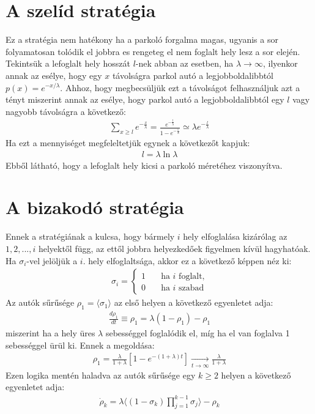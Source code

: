 \documentclass{article}
\begin{document}
	\section{A szelíd stratégia}
	Ez a stratégia nem hatékony ha a parkoló forgalma magas, ugyanis a sor folyamatosan tolódik el jobbra es rengeteg el nem foglalt hely lesz a sor elején. Tekintsük a lefoglalt hely hosszát $l$-nek abban az esetben, ha $\lambda \rightarrow \infty$, ilyenkor annak az esélye, hogy egy $x$ távolságra parkol autó a legjobboldalibbtól $p(x)=e^{-x/\lambda}$. Ahhoz, hogy megbecsüljük ezt a távolságot felhasználjuk azt a tényt miszerint annak az esélye, hogy parkol autó a legjobboldalibbtól egy $l$ vagy nagyobb távolságra a következő:
 	\begin{align}
		\sum_{x \geqslant l}e^{-\frac{x}{\lambda}} = \frac{e^{-\frac{l}{\lambda}}}{1-e^{-\frac{1}{\lambda}}} \simeq \lambda e^{-\frac{l}{\lambda}}
	\end{align}
	Ha ezt a mennyiséget megfeleltetjük egynek a következőt kapjuk: 
	\begin{align}
		l = \lambda \ln \lambda
	\end{align}
	Ebből látható, hogy a lefoglalt hely kicsi a parkoló méretéhez viszonyítva.
	\section{A bizakodó stratégia}
	Ennek a stratégiának a kulcsa, hogy bármely $i$ hely elfoglalása kizárólag az $1,2,...,i$ helyektől függ, az ettől jobbra helyezkedőek figyelmen kívül hagyhatóak.\\
	Ha $\sigma_i$-vel jelöljük a $i$. hely elfoglaltsága, akkor ez a következő képpen néz ki:
	\begin{align}
		\sigma_i=
		\begin{cases}
			1 &\quad \text{ha $i$ foglalt,} \\
			0 &\quad \text{ha $i$ szabad}
		\end{cases}
	\end{align}
	Az autók sűrűsége $\rho_1=\langle\sigma_1\rangle$ az első helyen a következő egyenletet adja:
	\begin{align}
		\frac{d\rho_1}{dt} \equiv \rho_1 = \lambda(1-\rho_1)-\rho_1
	\end{align}
	miszerint ha a hely üres $\lambda$ sebességgel foglalódik el, míg ha  el van foglalva 1 sebességgel ürül ki. Ennek a megoldása:
	\begin{align}
		\rho_1=\frac{\lambda}{1+\lambda}[1-e^{-(1+\lambda)t}]\xrightarrow[t \to \infty]{}\frac{\lambda}{1+\lambda}
	\end{align}
	Ezen logika mentén haladva az autók sűrűsége egy $k \geqslant 2$ helyen a következő egyenletet adja:
	\begin{align}
		\label{eq4}
		\dot{\rho}_k=\lambda \langle(1-\sigma_k)\prod_{j=1}^{k-1}\sigma_j \rangle - \rho_k
	\end{align}
\end{document}
